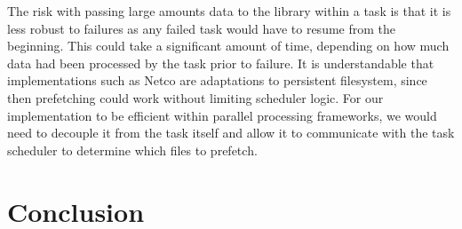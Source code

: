 The risk with passing large amounts data to the library within a task is that it
is less robust to failures as any failed task would have to resume from the
beginning. This could take a significant amount of time, depending on how much
data had been processed by the task prior to failure.
It is understandable that implementations such as Netco are adaptations to
persistent filesystem, since then prefetching could work without limiting
scheduler logic. For our implementation to be efficient within parallel
processing frameworks, we would need to decouple it from the task itself and
allow it to communicate with the task scheduler to determine which files to
prefetch.



\section{Conclusion}



